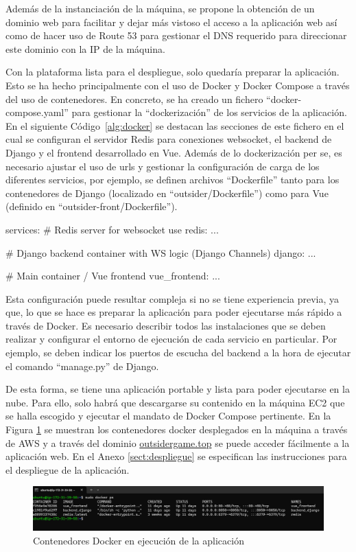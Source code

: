 Además de la instanciación de la máquina, se propone la obtención de un dominio web para facilitar y dejar más vistoso el acceso a la aplicación
web así como de hacer uso de Route 53 para gestionar el DNS requerido para direccionar este dominio con la IP de la máquina. 

Con la plataforma lista para el despliegue, solo quedaría preparar la aplicación. Esto se ha hecho principalmente con el uso de Docker y Docker Compose a través
del uso de contenedores. En concreto, se ha creado un fichero ``docker-compose.yaml'' para gestionar 
la ``dockerización'' de los servicios de la aplicación. En el siguiente Código~\ref{alg:docker} se destacan las secciones de este
fichero en el cual se configuran el servidor Redis para conexiones websocket, el backend de Django y el frontend
desarrollado en Vue. Además de lo dockerización per se, es necesario ajustar el uso de urls y gestionar la configuración
de carga de los diferentes servicios, por ejemplo, se definen archivos ``Dockerfile'' tanto para los contenedores
de Django (localizado en ``outsider/Dockerfile'') como para Vue (definido en ``outsider-front/Dockerfile'').

\begin{mypython}[float={h},caption={Estructura del fichero Docker Compose},label={alg:docker}]
	services:
		# Redis server for websocket use
		redis: ...
		
		# Django backend container with WS logic (Django Channels)
		django: ...
	  	
		# Main container / Vue frontend
		vue_frontend: ...
\end{mypython}

Esta configuración puede resultar compleja si no se tiene experiencia previa, ya que, lo que se hace es preparar
la aplicación para poder ejecutarse más rápido a través de Docker. Es necesario describir todos las 
instalaciones que se deben realizar y configurar el entorno de ejecución de cada servicio en particular. Por ejemplo,
se deben indicar los puertos de escucha del backend a la hora de ejecutar el comando ``manage.py'' de Django.

De esta forma, se tiene una aplicación portable y lista para poder ejecutarse en la nube. Para ello, solo 
habrá que descargarse su contenido en la máquina EC2 que se halla escogido y ejecutar el mandato de Docker Compose pertinente. En la
Figura \ref{fig:res_amazon} se muestran los contenedores docker desplegados en la máquina a través de AWS y a través del dominio 
\href{http://outsidergame.top/}{outsidergame.top} se puede acceder fácilmente a la aplicación web. En el Anexo \ref{sect:despliegue} se especifican
las instrucciones para el despliegue de la aplicación.

\begin{figure}[h]
	\centering
	\includegraphics[width=\textwidth,clip=true]{res_amazon.png}
	\caption{Contenedores Docker en ejecución de la aplicación}
	\label{fig:res_amazon}
\end{figure}
